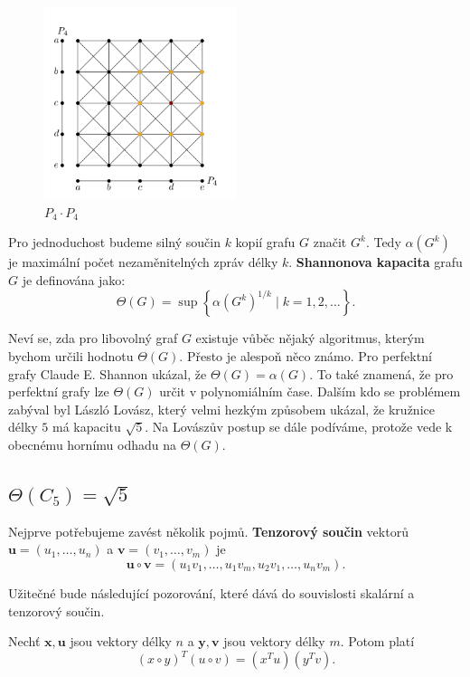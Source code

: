 \begin{figure}[h!]
    \centering
    \includegraphics[width=0.5\textwidth]{img/strong_product_P4_P4.png}   
    \caption{$P_4 \cdot P_4$}
    \label{fig:strong_product_P4_P4}
\end{figure}

Pro jednoduchost budeme silný součin $k$ kopií grafu $G$ značit $G^k$. Tedy $\alpha(G^k)$ je maximální počet nezaměnitelných zpráv délky $k$. \textbf{Shannonova kapacita} grafu $G$ je definována jako:
$$
    \Theta(G) = \sup \left\{ \alpha(G^k)^{1/k} \mid k = 1, 2, \dots \right\}.
$$

Neví se, zda pro libovolný graf $G$ existuje vůběc nějaký algoritmus, kterým bychom určili hodnotu $\Theta(G)$. Přesto je alespoň něco známo. Pro perfektní grafy Claude E. Shannon ukázal, že $\Theta(G) = \alpha(G)$. To také znamená, že pro perfektní grafy lze $\Theta(G)$ určit v polynomiálním čase. Dalším kdo se problémem zabýval byl László Lovász, který velmi hezkým způsobem ukázal, že kružnice délky $5$ má kapacitu $\sqrt{5}$. Na Lovászův postup se dále podíváme, protože vede k obecnému hornímu odhadu na $\Theta(G)$.

\subsection*{$\Theta(C_5) = \sqrt{5}$}

Nejprve potřebujeme zavést několik pojmů. \textbf{Tenzorový součin} vektorů $\mathbf{u} = \left(u_1, \dots, u_n \right)$ a $\mathbf{v} = \left(v_1, \dots, v_m \right)$ je
$$
    \mathbf{u} \circ \mathbf{v} = \left( u_1 v_1, \dots, u_1 v_m, u_2 v_1, \dots, u_n v_m \right).
$$

Užitečné bude následující pozorování, které dává do souvislosti skalární a tenzorový součin.

\begin{pz}
    Nechť $\mathbf{x}, \mathbf{u}$ jsou vektory délky $n$ a $\mathbf{y}, \mathbf{v}$ jsou vektory délky $m$. Potom platí
    \begin{equation}
        \left( x \circ y \right)^T \left( u \circ v \right) = \left( x^T u \right) \left( y^T v \right).
        \label{eq:tensor_scalar_product}
    \end{equation}
\end{pz}

